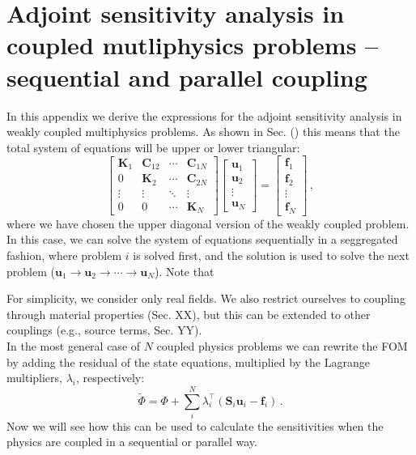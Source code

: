 \section{Adjoint sensitivity analysis in coupled mutliphysics problems -- sequential and parallel coupling}\label{app:appendix1}

In this appendix we derive the expressions for the adjoint sensitivity analysis in weakly coupled multiphysics problems. As shown in Sec.
() this means that the total system of equations will be upper or lower triangular:
\begin{equation} \label{eq:multiphysics_weak}
    \begin{bmatrix}
        \mathbf{K}_1 & \mathbf{C}_{12} & \cdots & \mathbf{C}_{1N} \\
        0 & \mathbf{K}_2 & \cdots & \mathbf{C}_{2N} \\
        \vdots & \vdots & \ddots & \vdots\\
        0 & 0 & \cdots & \mathbf{K}_N
    \end{bmatrix}
    \begin{bmatrix}
        \mathbf{u}_1\\
        \mathbf{u}_2\\
        \vdots\\
        \mathbf{u}_N
    \end{bmatrix}
    =
    \begin{bmatrix}
        \mathbf{f}_1\\
        \mathbf{f}_2\\
        \vdots\\
        \mathbf{f}_N
    \end{bmatrix}\,,
\end{equation}
where we have chosen the upper diagonal version of the weakly coupled problem. In this case, we can solve the system of equations sequentially in a seggregated fashion,
 where problem $i$ is solved first, and the solution is used to solve the next problem 
 ($\mathbf{u}_1 \to \mathbf{u}_2 \to \cdots \to \mathbf{u}_N$). Note that 

For simplicity, we consider
only real fields. We also restrict ourselves to coupling through material properties (Sec. XX), but this can be extended to other couplings
(e.g., source terms, Sec. YY).\\

In the most general case of $N$ coupled physics problems we can rewrite the FOM by adding the residual
of the state equations, multiplied by the Lagrange multipliers, $\lambda_i$, 
respectively:
\begin{equation}\label{eq:adj_init}
    \tilde{\Phi} =\Phi + \sum^N_i \lambda_{i}^{\top}\left(\mathbf{S}_i \mathbf{u}_i -\mathbf{f}_i\right)\,.
\end{equation}
Now we will see how this can be used to calculate the sensitivities when the physics are coupled in a sequential or parallel way.

